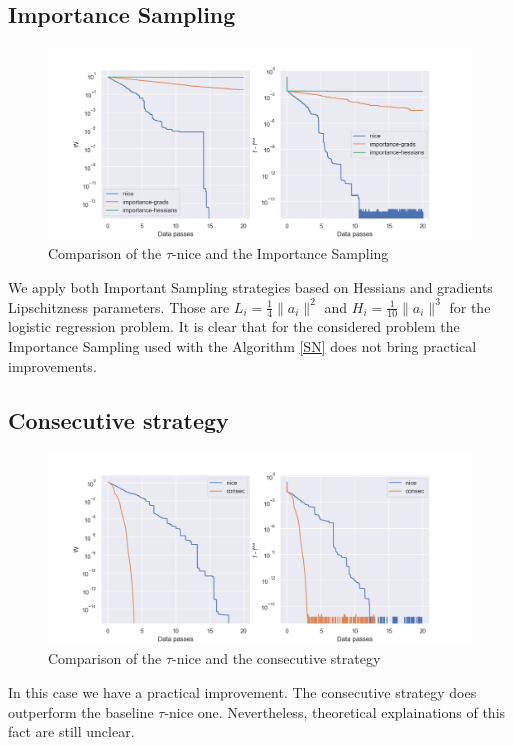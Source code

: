 \documentclass{article}
\theoremstyle{definition}
\theoremstyle{assumption}
\theoremstyle{lemma}
\theoremstyle{theorem}
\theoremstyle{proposition}
\begin{document}
	\subsection{Importance Sampling}
	\begin{figure}[h!]\label{fig:2}
		\centering
		\includegraphics[width=\textwidth]{importance sampling}
		\caption{Comparison of the $\tau$-nice and the Importance Sampling}
	\end{figure}
	We apply both Important Sampling strategies based on Hessians and gradients Lipschitzness parameters. Those are $L_i = \frac{1}{4}\|a_i\|^2$ and $H_i = \frac{1}{10} \|a_i\|^3$ for the logistic regression problem. It is clear that for the considered problem the Importance Sampling used with the Algorithm \ref{SN} does not bring practical improvements.
	
	\subsection{Consecutive strategy}
	\begin{figure}[h!]\label{fig:3}
		\centering
		\includegraphics[width=\textwidth]{consecutive strategy 10}
		\caption{Comparison of the $\tau$-nice and the consecutive strategy}
	\end{figure}
	In this case we have a practical improvement. The consecutive strategy does outperform the baseline $\tau$-nice one. Nevertheless, theoretical explainations of this fact are still unclear.
	
\end{document}
